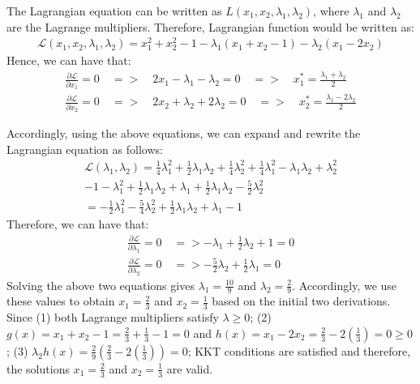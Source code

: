 \documentclass[12pt,a4paper]{article}
\begin{document}
	\noindent The Lagrangian equation can be written as $L(x_1, x_2, \lambda_1, \lambda_2)$, where $\lambda_1$ and $\lambda_2$ are the Lagrange multipliers. Therefore, Lagrangian function would be written as:
	\begin{align*}
		\mathcal{L}(x_1, x_2, \lambda_1, \lambda_2) = x_1^2 +x_2^2-1 - \lambda_1(x_1 +x_2-1)-\lambda_2(x_1-2x_2)
	\end{align*}
	Hence, we can have that:
	\begin{align*}
		\frac{\partial \mathcal{L}}{\partial x_1}=0 \quad => \quad 2x_1-\lambda_1-\lambda_2=0 \quad => \quad x_1^* = \frac{\lambda_1+\lambda_2}{2}\\
		\frac{\partial \mathcal{L}}{\partial x_2}=0 \quad => \quad 2x_2+\lambda_2+2\lambda_2=0 \quad => \quad x_2^* = \frac{\lambda_1-2\lambda_2}{2}
	\end{align*}
	
	\noindent Accordingly, using the above equations, we can expand and rewrite the Lagrangian equation as follows:
	\begin{align*}
		\mathcal{L}(\lambda_1, \lambda_2) = \frac{1}{4}\lambda_1^2+\frac{1}{2}\lambda_1\lambda_2+\frac{1}{4}\lambda_2^2 
		+\frac{1}{4}\lambda_1^2-\lambda_1\lambda_2+\lambda_2^2 \\
		-1 
		-\lambda_1^2+\frac{1}{2}\lambda_1\lambda_2+\lambda_1
		+\frac{1}{2}\lambda_1\lambda_2-\frac{5}{2}\lambda_2^2 \\
		= -\frac{1}{2}\lambda_1^2-\frac{5}{4}\lambda_2^2+\frac{1}{2}\lambda_1\lambda_2+\lambda_1-1 \qquad \quad
	\end{align*}
	Therefore, we can have that:
	\begin{align*}
	\frac{\partial \mathcal{L}}{\partial \lambda_1}=0 \quad => -\lambda_1+\frac{1}{2}\lambda_2+1=0 \\
	\frac{\partial \mathcal{L}}{\partial \lambda_2}=0 \quad => -\frac{5}{2}\lambda_2+\frac{1}{2}\lambda_1=0
	\end{align*}
	Solving the above two equations gives $\lambda_1=\frac{10}{9}$ and $\lambda_2 = \frac{2}{9}$. Accordingly, we use these values to obtain $x_1=\frac{2}{3}$ and $x_2=\frac{1}{3}$ based on the initial two derivations. Since (1) both Lagrange multipliers satisfy $\lambda\geq 0$; (2) $g(x)=x_1+x_2-1 = \frac{2}{3}+\frac{1}{3}-1=0$ and $h(x)=x_1-2x_2 = \frac{2}{3}-2(\frac{1}{3})=0\geq 0$; (3) $\lambda_2h(x) = \frac{2}{9}(\frac{2}{3}-2(\frac{1}{3}))=0 $; KKT conditions are satisfied and therefore, the solutions $x_1=\frac{2}{3}$ and $x_2=\frac{1}{3}$ are valid.
	
\end{document}
